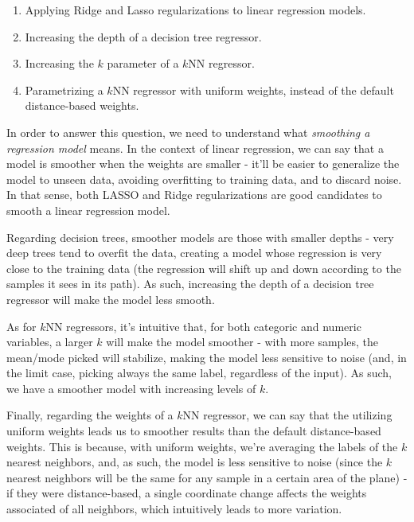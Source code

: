 \documentclass[12pt]{article}
\begin{document}
\begin{enumerate}[leftmargin=\labelsep]
{        \begin{enumerate}
          \item Applying Ridge and Lasso regularizations to linear regression models.
          \item Increasing the depth of a decision tree regressor.
          \item Increasing the $k$ parameter of a $k$NN regressor.
          \item Parametrizing a $k$NN regressor with uniform weights, instead of the default distance-based weights.
        \end{enumerate}
        }

        In order to answer this question, we need to understand what \textit{smoothing
          a regression model} means. In the context of linear regression, we can say that
        a model is smoother when the weights are smaller - it'll be easier
        to generalize the model to unseen data, avoiding overfitting to training data,
        and to discard noise. In that sense, both LASSO and Ridge regularizations
        are good candidates to smooth a linear regression model.

        Regarding decision trees, smoother models are those with smaller depths -
        very deep trees tend to overfit the data, creating a model whose regression
        is very close to the training data (the regression will shift up and down
        according to the samples it sees in its path). As such,
        increasing the depth of a decision tree regressor will make the model less
        smooth.

        As for $k$NN regressors, it's intuitive that, for both categoric and numeric
        variables, a larger $k$ will make the model smoother - with more samples,
        the mean/mode picked will stabilize, making the model less sensitive to
        noise (and, in the limit case, picking always the same label, regardless
        of the input). As such, we have a smoother model with increasing levels of $k$.

        Finally, regarding the weights of a $k$NN regressor, we can say that the
        utilizing uniform weights leads us to smoother results than the default
        distance-based weights. This is because, with uniform weights, we're
        averaging the labels of the $k$ nearest neighbors, and, as such, the
        model is less sensitive to noise (since the $k$ nearest neighbors will be
        the same for any sample in a certain area of the plane) - if they were distance-based, a single
        coordinate change affects the weights associated of all neighbors, which
        intuitively leads to more variation.
\end{enumerate}
\end{document}

